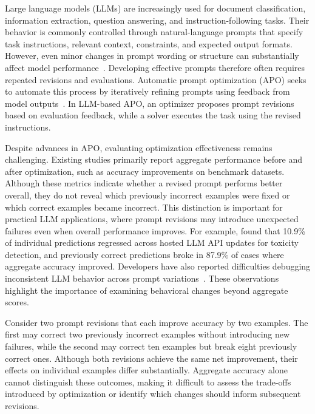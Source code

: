 \documentclass[10pt]{article} %
\begin{document}
Large language models (LLMs) are increasingly used for document classification, information extraction, question answering, and instruction-following tasks. Their behavior is commonly controlled through natural-language prompts that specify task instructions, relevant context, constraints, and expected output formats. However, even minor changes in prompt wording or structure can substantially affect model performance~\citep{sclar2024quantifying}. Developing effective prompts therefore often requires repeated revisions and evaluations. Automatic prompt optimization (APO) seeks to automate this process by iteratively refining prompts using feedback from model outputs~\citep{zhou2023ape,yang2024opro,pryzant2023protegi}. In LLM-based APO, an optimizer proposes prompt revisions based on evaluation feedback, while a solver executes the task using the revised instructions.

Despite advances in APO, evaluating optimization effectiveness remains challenging. Existing studies primarily report aggregate performance before and after optimization, such as accuracy improvements on benchmark datasets. Although these metrics indicate whether a revised prompt performs better overall, they do not reveal which previously incorrect examples were fixed or which correct examples became incorrect. This distinction is important for practical LLM applications, where prompt revisions may introduce unexpected failures even when overall performance improves. For example, \citet{ma2024regression} found that 10.9\% of individual predictions regressed across hosted LLM API updates for toxicity detection, and previously correct predictions broke in 87.9\% of cases where aggregate accuracy improved. Developers have also reported difficulties debugging inconsistent LLM behavior across prompt variations~\citep{errica2025wrong}. These observations highlight the importance of examining behavioral changes beyond aggregate scores.

Consider two prompt revisions that each improve accuracy by two examples. The first may correct two previously incorrect examples without introducing new failures, while the second may correct ten examples but break eight previously correct ones. Although both revisions achieve the same net improvement, their effects on individual examples differ substantially. Aggregate accuracy alone cannot distinguish these outcomes, making it difficult to assess the trade-offs introduced by optimization or identify which changes should inform subsequent revisions.
\end{document}
